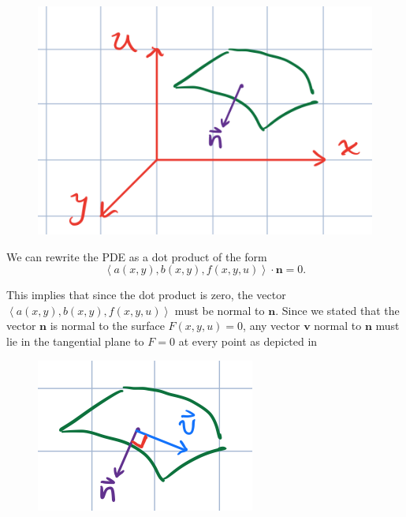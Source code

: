 \begin{figure}[h!]
	\centering \includegraphics[scale=.75]{fig/fig2_method_characteristics.png}
	\caption{}
	\label{fig_normal_vector}
\end{figure}

We can rewrite the PDE as a dot product of the form
\begin{equation}
  \left\langle a(x, y), b(x, y), f(x, y, u) \right\rangle \cdot \mathbf{n} = 0.
\end{equation}

This implies that since the dot product is zero, the vector $\left\langle a(x,
y), b(x, y), f(x, y, u) \right\rangle$ must be normal to $\mathbf{n}$. Since we
stated that the vector $\mathbf{n}$ is normal to the surface $F(x, y, u) = 0$,
any vector $\mathbf{v}$ normal to $\mathbf{n}$ must lie in the tangential plane
to $F = 0$ at every point as depicted in 
\begin{figure}[h!]
	\centering \includegraphics[scale=.75]{fig/fig3_method_characteristics.png}
	\caption{}
	\label{fig_tangential_vector}
\end{figure}

